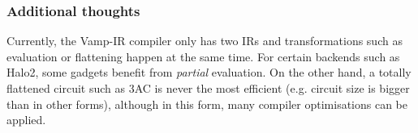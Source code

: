 \documentclass[
    9pt,            %
    techreport,        %
    affiltop,       %
]{art}
\begin{document}
\subsubsection{Additional thoughts}

Currently, the Vamp-IR compiler only has two IRs and transformations such as evaluation or flattening happen at the same time. For certain backends such as Halo2, some gadgets benefit from \textit{partial} evaluation. On the other hand, a totally flattened circuit such as 3AC is never the most efficient (e.g. circuit size is bigger than in other forms), although in this form, many compiler optimisations can be applied.





\end{document}
